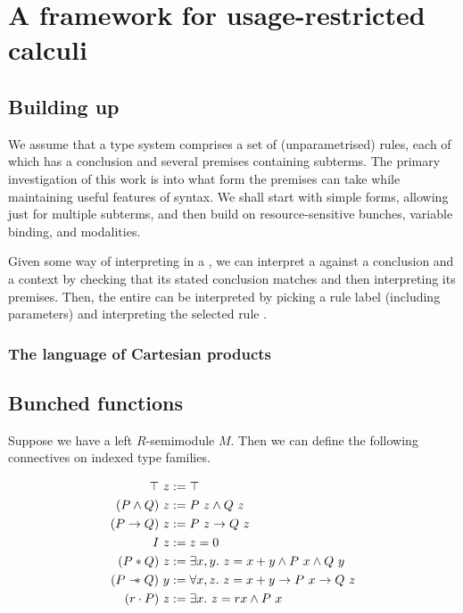 \chapter{A framework for usage-restricted calculi}

\section{Building up}

We assume that a type system comprises a set of (unparametrised) rules, each
of which has a conclusion and several premises containing subterms.
The primary investigation of this work is into what form the premises can take
while maintaining useful features of syntax.
We shall start with simple forms, allowing just for multiple subterms, and
then build on resource-sensitive bunches, variable binding, and modalities.

\System{}
\Rule{}

Given some way  of interpreting
 in a , we can interpret a
 against a conclusion and a context by checking that its
stated conclusion matches and then interpreting its premises.
Then, the entire  can be interpreted by picking a rule
label (including parameters)  and interpreting the selected rule
\AgdaSpace{}.

\semr{}
\sems{}

\subsection{The language of Cartesian products}

\SimplePremises

\section{Bunched functions}

Suppose we have a left $R$-semimodule $M$.
Then we can define the following connectives on indexed type families.

\begin{align*}
  \top~z &:= \top \\
  (P \wedge Q)~z &:= P~z \wedge Q~z \\
  (P \to Q)~z &:= P~z \to Q~z \\
  I~z &:= z = 0 \\
  (P * Q)~z &:= \exists x,y.~z = x+y \wedge P~x \wedge Q~y \\
  (P \mathrel{\mathord{-}\hspace{-0.75ex}*} Q)~y &:= \forall x,z.~z = x+y \to P~x \to Q~z \\
  (r \cdot P)~z &:= \exists x.~z = rx \wedge P~x
\end{align*}

